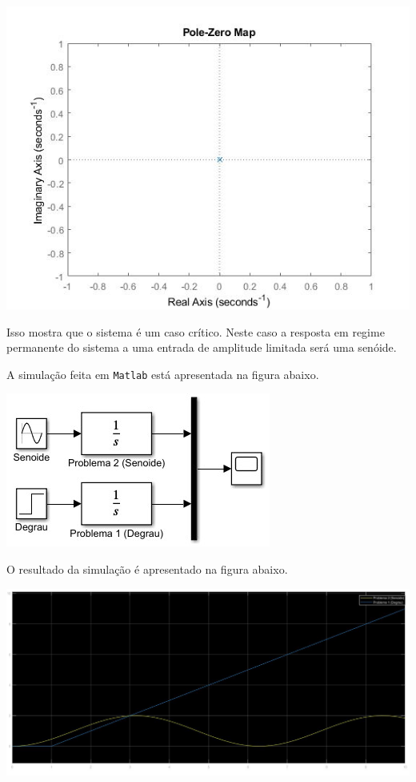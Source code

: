 \documentclass[
]{book}
\begin{document}
\includegraphics{Imagens/Lab2/prob2.jpg}

Isso mostra que o sistema é um caso crítico. Neste caso a resposta em regime permanente do sistema a uma entrada de amplitude limitada será uma senóide.

A simulação feita em \texttt{Matlab} está apresentada na figura abaixo.

\includegraphics{Imagens/Lab2/simP2.jpg}

O resultado da simulação é apresentado na figura abaixo.

\includegraphics{Imagens/Lab2/prob2B.jpg}
\end{document}
